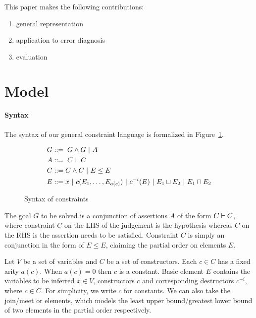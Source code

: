 
This paper makes the following contributions:

\begin{enumerate}
\item
general representation

\item
application to error diagnosis

\item
evaluation
\end{enumerate}

\section{Model}
\label{sec:model}

\paragraph{Syntax}

The syntax of our general constraint language is formalized in
Figure~\ref{figure:lang:syntax}.

\begin{figure}
\begin{align*}
G &::=\; G \land G\ |\ A \\
A &::=\; C \vdash C \\
C &::= C \land C\ |\  E \leq E \\
E &::= x\ |\ c(E_1,\dots,E_{a(c)})\ |\ c^{-i}(E)\ |\ E_1 \sqcup E_2 \
|\ E_1 \sqcap E_2
\end{align*}
\caption{Syntax of constraints}
\label{figure:lang:syntax}
\end{figure}

The goal $G$ to be solved is a conjunction of assertions $A$ of the
form $C \vdash C$, where constraint $C$ on the LHS of the judgement
is the hypothesis whereas $C$ on the RHS is the assertion needs to be
satisfied. Constraint $C$ is simply an conjunction in the form of $E
\leq E$, claiming the partial order on elements $E$. 

Let $V$ be a set of variables and $C$ be a set of constructors. Each
$c\in C$ has a fixed arity $a(c)$. When $a(c)=0$ then $c$ is a
constant. Basic element $E$ contains the variables to be inferred
$x\in V$, constructors $c$ and corresponding destructors $c^{-i}$,
where $c\in C$. For simplicity, we write $c$ for constants. We can
also take the join/meet or elements, which models the least upper
bound/greatest lower bound of two elements in the partial order
respectively. 

